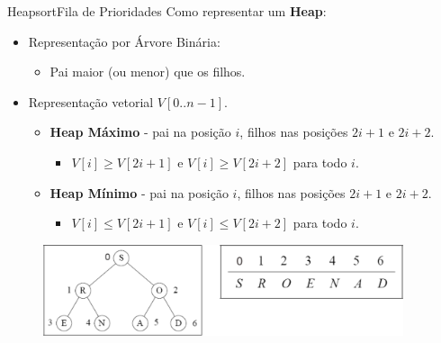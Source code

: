 \documentclass[aspectratio=169]{beamer}
\begin{document}
\begin{frame}{Heapsort}{Fila de Prioridades}
Como representar um {\bf Heap}:
\begin{itemize}
\item Representação por Árvore Binária:
\begin{itemize}
\item Pai maior (ou menor) que os filhos.
\end{itemize}
\item Representação vetorial $V[0..n-1]$.
\begin{itemize}
\item {\bf Heap Máximo} - pai na posição $i$, filhos nas posições $2i+1$ e $2i+2$.
\begin{itemize}
\item $V[i] \geq V[2i+1]$ e $V[i] \geq V[2i+2]$ para todo $i$.
\end{itemize}
\item {\bf Heap Mínimo} - pai na posição $i$, filhos nas posições $2i+1$ e $2i+2$.
\begin{itemize}
\item $V[i] \leq V[2i+1]$ e $V[i] \leq V[2i+2]$ para todo $i$.
\end{itemize}
\end{itemize}
\end{itemize}

\begin{figure}[!h]
  \centering
  \includegraphics[width=300pt]{imgs/representacao_fila_prioridade.png}
  \label{fig_representacao_fila_prioridade}
\end{figure}
\end{frame}

\end{document}
